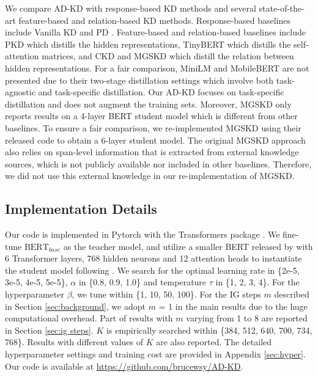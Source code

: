 \documentclass[11pt]{article}
\begin{document}
We compare AD-KD with response-based KD methods and several state-of-the-art feature-based and relation-based KD methods. Response-based baselines include Vanilla KD \cite{hinton2015distilling} and PD \cite{turc2019well}. Feature-based and relation-based baselines include PKD \cite{sun-etal-2019-patient} which distills the hidden representations, TinyBERT \cite{jiao-etal-2020-tinybert} which distills the self-attention matrices, and CKD \citep{park-etal-2021-distilling} and MGSKD \citep{liu-etal-2022-multi-granularity} which distill the relation between hidden representations. For a fair comparison, MiniLM \citep{wang2020minilm,wang-etal-2021-minilmv2} and MobileBERT \citep{sun-etal-2020-mobilebert} are not presented due to their two-stage distillation settings which involve both task-agnostic and task-specific distillation. Our AD-KD focuses on task-specific distillation and does not augment the training sets. Moreover, MGSKD \citep{liu-etal-2022-multi-granularity} only reports results on a 4-layer BERT student model which is different from other baselines. To ensure a fair comparison, we re-implemented MGSKD using their released code to obtain a 6-layer student model. The original MGSKD approach also relies on span-level information that is extracted from external knowledge sources, which is not publicly available nor included in other baselines. Therefore, we did not use this external knowledge in our re-implementation of MGSKD. 

\subsection{Implementation Details}
Our code is implemented in Pytorch with the Transformers package \citep{wolf-etal-2020-transformers}. We fine-tune $\text{BERT}_{base}$ as the teacher model, and utilize a smaller BERT released by \citet{turc2019well} with 6 Transformer layers, 768 hidden neurons and 12 attention heads to instantiate the student model following \citet{park-etal-2021-distilling}. We search for the optimal learning rate in \{2e-5, 3e-5, 4e-5, 5e-5\}, $\alpha$ in \{0.8, 0.9, 1.0\} and temperature $\tau$ in \{1, 2, 3, 4\}. For the hyperparameter $\beta$, we tune within \{1, 10, 50, 100\}. For the IG steps $m$ described in Section \ref{sec:background}, we adopt $m$ = 1 in the main results due to the huge computational overhead. Part of results with $m$ varying from 1 to 8 are reported in Section \ref{sec:ig steps}.
$K$ is empirically searched within \{384, 512, 640, 700, 734, 768\}. Results with different values of $K$ are also reported. The detailed hyperparameter settings and training cost are provided in Appendix \ref{sec:hyper}. Our code is available at \url{https://github.com/brucewsy/AD-KD}.
\end{document}
